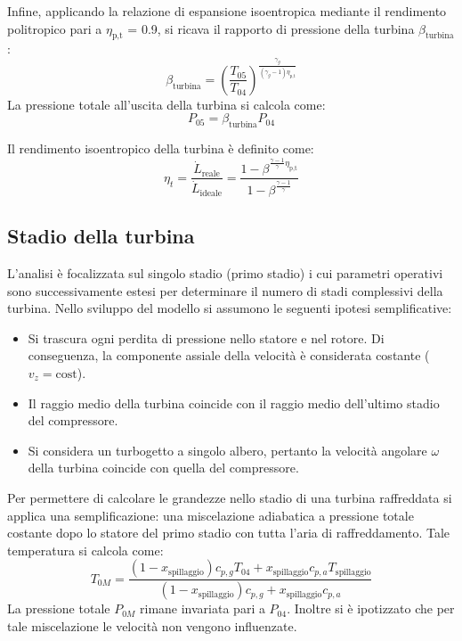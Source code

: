 Infine, applicando la relazione di espansione isoentropica mediante il rendimento politropico pari a $\eta_{\text{p,t}}$ = 0.9, si ricava il rapporto di pressione della turbina $\beta_{\text{turbina}}$:
\begin{equation*}
\beta_{\text{turbina}} = \left( \frac{T_{05}}{T_{04}} \right)^{\frac{\gamma_g}{(\gamma_g-1)\eta_{\text{p,t}}}}
\label{eqAPP:betaTurbinaCalc}
\end{equation*}
La pressione totale all'uscita della turbina si calcola come:
\begin{equation*}
P_{05} = \beta_{\text{turbina}} P_{04}
\end{equation*}

Il rendimento isoentropico della turbina è definito come:
\begin{equation*}
    \eta_t = \frac{\dot{L}_{\text{reale}}}{\dot{L}_{\text{ideale}}} = \frac{1 - \beta^{\frac{\gamma-1}{\gamma} \eta_{\text{p,t}}}}{1 - \beta^{\frac{\gamma-1}{\gamma}}}
\end{equation*}

\subsection{Stadio della turbina}
L'analisi è focalizzata sul singolo stadio (primo stadio) i cui parametri operativi sono successivamente estesi per determinare il numero di stadi complessivi della turbina.
Nello sviluppo del modello si assumono le seguenti ipotesi semplificative:
\begin{itemize}
\item Si trascura ogni perdita di pressione nello statore e nel rotore. Di conseguenza, la componente assiale della velocità è considerata costante ($v_{z} = \text{cost}$).
\item Il raggio medio della turbina coincide con il raggio medio dell'ultimo stadio del compressore.
\item Si considera un turbogetto a singolo albero, pertanto la velocità angolare $\omega$ della turbina coincide con quella del compressore.
\end{itemize}

Per permettere di calcolare le grandezze nello stadio di una turbina raffreddata si applica una semplificazione: una miscelazione adiabatica a pressione totale costante dopo lo statore del primo stadio con tutta l'aria di raffreddamento. Tale temperatura si calcola come:
\begin{equation}
T_{0M} = \frac{(1 - x_{\text{spillaggio}}) c_{p,g} T_{04} + x_{\text{spillaggio}} c_{p,a} T_{\text{spillaggio}}}{(1 - x_{\text{spillaggio}}) c_{p,g} + x_{\text{spillaggio}} c_{p,a}}
\label{appB:turbina:eq:miscelazione}
\end{equation}
La pressione totale $P_{0M}$ rimane invariata pari a $P_{04}.$ Inoltre si è ipotizzato che per tale miscelazione le velocità non vengono influenzate. 

